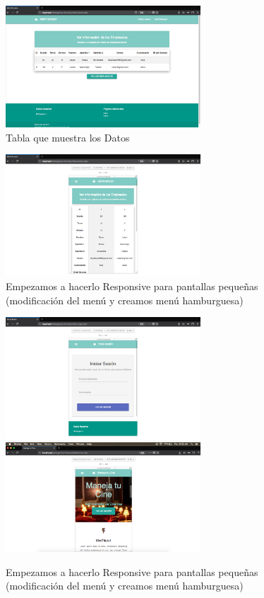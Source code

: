 \documentclass[12pt, fleqn]{report}                             %
\begin{document}
        \begin{figure}[ht]
            \centering
            \includegraphics[width=0.65\textwidth]{EjemploInterfazSegundaParte3}
            \caption{Tabla que muestra los Datos}
        \end{figure}

        \begin{figure}[ht]
            \centering
            \includegraphics[width=0.65\textwidth]{EjemploInterfazSegundaParte4}
            \caption{Empezamos a hacerlo Responsive para pantallas pequeñas (modificación del menú y creamos menú hamburguesa)}
        \end{figure}

        \begin{figure}[ht]
            \centering
            \includegraphics[width=0.65\textwidth]{EjemploInterfazSegundaParte5}
            \includegraphics[width=0.65\textwidth]{EjemploInterfazSegundaParte7}
            \caption{Empezamos a hacerlo Responsive para pantallas pequeñas (modificación del menú y creamos menú hamburguesa)}
        \end{figure}
\end{document}
